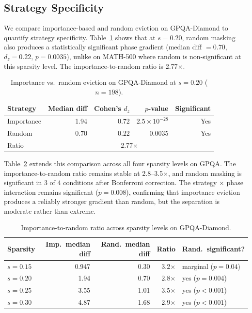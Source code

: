 \documentclass[11pt,a4paper]{article}
\begin{document}
\subsection{Strategy Specificity}\label{sec:specificity}

We compare importance-based and random eviction on GPQA-Diamond to quantify strategy specificity. Table~\ref{tab:strategy-gpqa} shows that at $s{=}0.20$, random masking also produces a statistically significant phase gradient (median diff $= 0.70$, $d_z{=}0.22$, $p{=}0.0035$), unlike on MATH-500 where random is non-significant at this sparsity level. The importance-to-random ratio is 2.77$\times$.

\begin{table}[t]
\centering
\caption{Importance vs.\ random eviction on GPQA-Diamond at $s{=}0.20$ ($n{=}198$).}
\label{tab:strategy-gpqa}
\small
\begin{tabular}{lrrrr}
\toprule
Strategy & Median diff & Cohen's $d_z$ & $p$-value & Significant \\
\midrule
Importance & 1.94 & 0.72 & $2.5 \times 10^{-28}$ & Yes \\
Random & 0.70 & 0.22 & 0.0035 & Yes \\
\midrule
Ratio & \multicolumn{4}{c}{2.77$\times$} \\
\bottomrule
\end{tabular}
\end{table}

Table~\ref{tab:specificity-sparsity} extends this comparison across all four sparsity levels on GPQA. The importance-to-random ratio remains stable at 2.8--3.5$\times$, and random masking is significant in 3 of 4 conditions after Bonferroni correction. The strategy $\times$ phase interaction remains significant ($p{=}0.008$), confirming that importance eviction produces a reliably stronger gradient than random, but the separation is moderate rather than extreme.

\begin{table}[t]
\centering
\caption{Importance-to-random ratio across sparsity levels on GPQA-Diamond.}
\label{tab:specificity-sparsity}
\small
\begin{tabular}{lrrrl}
\toprule
Sparsity & Imp.\ median diff & Rand.\ median diff & Ratio & Rand.\ significant? \\
\midrule
$s{=}0.15$ & 0.947 & 0.30 & 3.2$\times$ & marginal ($p{=}0.04$) \\
$s{=}0.20$ & 1.94 & 0.70 & 2.8$\times$ & yes ($p{=}0.004$) \\
$s{=}0.25$ & 3.55 & 1.01 & 3.5$\times$ & yes ($p{<}0.001$) \\
$s{=}0.30$ & 4.87 & 1.68 & 2.9$\times$ & yes ($p{<}0.001$) \\
\bottomrule
\end{tabular}
\end{table}
\end{document}
